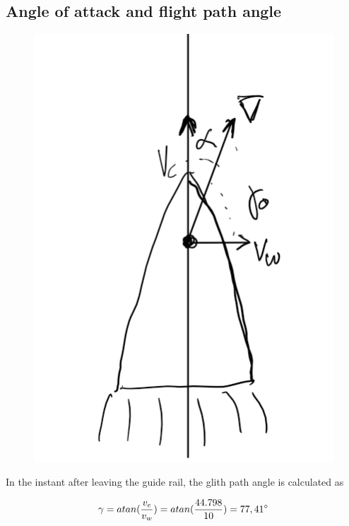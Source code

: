 \subsection{Angle of attack and flight path angle}


\begin{figure}[H]
	\centering
	\includegraphics[width=0.3\linewidth]{pics/screenshot002}
	\caption{}
	\label{fig:screenshot002}
\end{figure}

In the instant after leaving the guide rail, the glith path angle is calculated as 

\begin{equation}
	\gamma = atan(\frac{v_e}{v_w}) = atan(\frac{44.798}{10}) = 77,41 \degree
\end{equation}